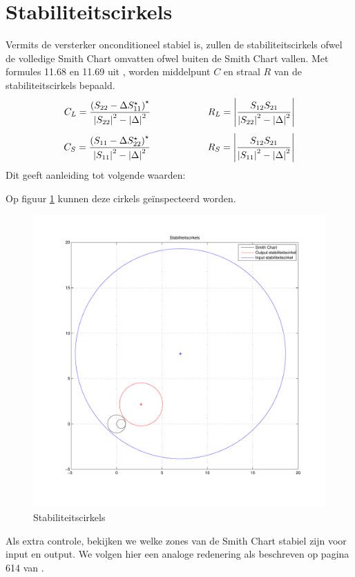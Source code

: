   \section{Stabiliteitscirkels}
    Vermits de versterker onconditioneel stabiel is, zullen de stabiliteitscirkels ofwel de volledige Smith Chart omvatten ofwel buiten de Smith Chart vallen.   Met formules 11.68 en 11.69 uit \cite{Pozar}, worden middelpunt $C$ en straal $R$ van de stabiliteitscirkels bepaald.
    \[
      C_L = \frac{\left(S_{22} - \Delta S_{11}^{\star}\right)^{\star}}{\left| S_{22} \right|^2 - \left|\Delta\right|^2}
      \qquad \qquad \qquad
      R_L = \left| \frac{S_{12}S_{21}}{\left| S_{22} \right|^2 - \left|\Delta\right|^2}\right|
    \]
    \[
      C_S = \frac{\left(S_{11} - \Delta S_{22}^{\star}\right)^{\star}}{\left| S_{11} \right|^2 - \left|\Delta\right|^2}
      \qquad \qquad \qquad
      R_S = \left| \frac{S_{12}S_{21}}{\left| S_{11} \right|^2 - \left|\Delta\right|^2}\right|
    \]
    Dit geeft aanleiding tot volgende waarden:
    
    
    Op figuur \ref{fig:stabCirkels} kunnen deze cirkels ge\"inspecteerd worden.
    \begin{figure}[!h]
      \centering
      \includegraphics[width=\textwidth,keepaspectratio=true]{fig/stabiliteitscirkels.pdf}  
      \caption{Stabiliteitscirkels} 
      \label{fig:stabCirkels}
    \end{figure}
    Als extra controle, bekijken we welke zones van de Smith Chart stabiel zijn voor input en output. We volgen hier
    een analoge redenering als beschreven op pagina 614 van \cite{Pozar}.
    

